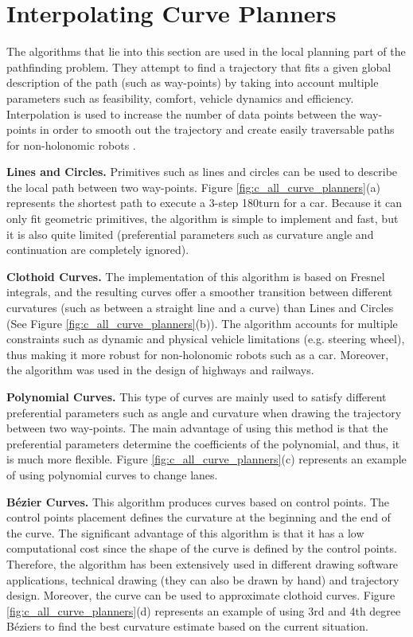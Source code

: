 \section{Interpolating Curve Planners} \label{C. Interpolating curve planners}


The algorithms that lie into this section are used in the local planning part of the pathfinding problem. They attempt to find a trajectory that fits a given global description of the path (such as way-points) by taking into account multiple parameters such as feasibility, comfort, vehicle dynamics and efficiency. Interpolation is used to increase the number of data points between the way-points in order to smooth out the trajectory and create easily traversable paths for non-holonomic robots \cite{gonzalez2016review}.

\textbf{Lines and Circles.} Primitives such as lines and circles can be used to describe the local path between two way-points. Figure \ref{fig:c_all_curve_planners}(a) represents the shortest path to execute a 3-step 180\degree turn for a car. Because it can only fit geometric primitives, the algorithm is simple to implement and fast, but it is also quite limited (preferential parameters such as curvature angle and continuation are completely ignored).

\textbf{Clothoid Curves.} The implementation of this algorithm is based on Fresnel integrals, and the resulting curves offer a smoother transition between different curvatures (such as between a straight line and a curve) than Lines and Circles (See Figure \ref{fig:c_all_curve_planners}(b)). The algorithm accounts for multiple constraints such as dynamic and physical vehicle limitations (e.g. steering wheel), thus making it more robust for non-holonomic robots such as a car. Moreover, the algorithm was used in the design of highways and railways.

\textbf{Polynomial Curves.} This type of curves are mainly used to satisfy different preferential parameters such as angle and curvature when drawing the trajectory between two way-points. The main advantage of using this method is that the preferential parameters determine the coefficients of the polynomial, and thus, it is much more flexible. Figure \ref{fig:c_all_curve_planners}(c) represents an example of using polynomial curves to change lanes.

\textbf{Bézier Curves.} This algorithm produces curves based on control points. The control points placement defines the curvature at the beginning and the end of the curve.  The significant advantage of this algorithm is that it has a low computational cost since the shape of the curve is defined by the control points. Therefore, the algorithm has been extensively used in different drawing software applications, technical drawing (they can also be drawn by hand) and trajectory design. Moreover, the curve can be used to approximate clothoid curves. Figure \ref{fig:c_all_curve_planners}(d) represents an example of using 3rd and 4th degree Béziers to find the best curvature estimate based on the current situation.

